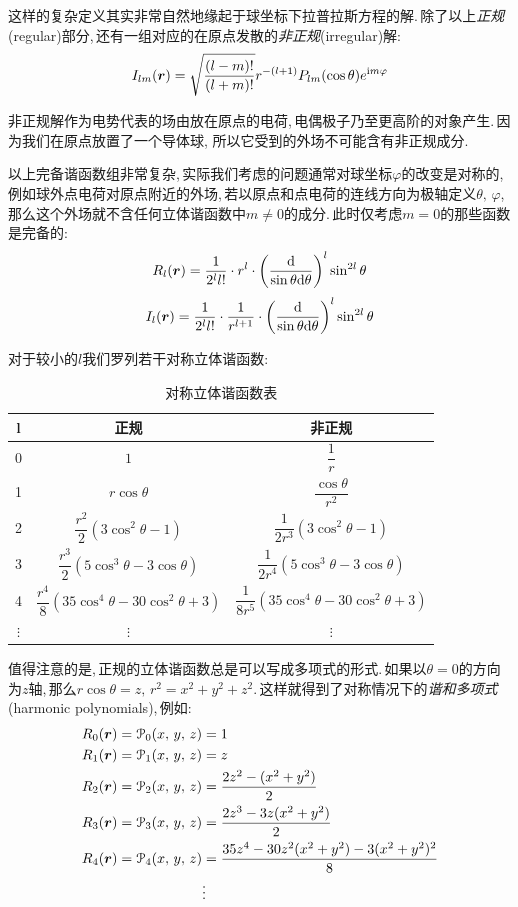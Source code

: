 这样的复杂定义其实非常自然地缘起于球坐标下拉普拉斯方程的解.\,除了以上\emph{正规}(regular)部分,\,还有一组对应的在原点发散的\emph{非正规}(irregular)解:
\[I_{lm}(\boldsymbol{r})=\sqrt{\frac{(l-m)!}{(l+m)!}}r^{-(l+1)}P_{lm}(\cos\theta)e^{{\rm i} m\varphi}\]

非正规解作为电势代表的场由放在原点的电荷,\,电偶极子乃至更高阶的对象产生.\,因为我们在原点放置了一个导体球, 所以它受到的外场不可能含有非正规成分.

以上完备谐函数组非常复杂,\,实际我们考虑的问题通常对球坐标$\varphi$的改变是对称的,\,例如球外点电荷对原点附近的外场,\,若以原点和点电荷的连线方向为极轴定义$\theta,\,\varphi$,\,那么这个外场就不含任何立体谐函数中$m\neq 0$的成分.\,此时仅考虑$m=0$的那些函数是完备的:
\[R_l(\boldsymbol{r})=\frac{1}{2^ll!}\cdot{r^l}\cdot\left(\frac{\textrm{d}}{\sin\theta\textrm{d} \theta}\right)^l\sin^{2l}\theta\]
\[I_l(\boldsymbol{r})=\frac{1}{2^ll!}\cdot\frac{1}{r^{l+1}}\cdot\left(\frac{\textrm{d}}{\sin\theta\textrm{d} \theta}\right)^l\sin^{2l}\theta\]

对于较小的$l$我们罗列若干对称立体谐函数:
\begin{table}[H]
\centering
\def\arraystretch{2}
\begin{tabular}{c|c|c}
\hline
l	&正规	&非正规 \\
\hline\hline
0	&$1$	&$\dfrac{1}{r}$\\\hline
1	&$r\cos\theta$	&$\dfrac{\cos\theta}{r^2}$\\\hline
2	&$\dfrac{r^2}{2}(3\cos^2\theta-1)$	&$\dfrac{1}{2r^3}(3\cos^2\theta-1)$\\\hline
3	&$\dfrac{r^3}{2}(5\cos^3\theta-3\cos\theta)$	&$\dfrac{1}{2r^4}(5\cos^3\theta-3\cos\theta)$\\\hline
4	&$\dfrac{r^4}{8}(35\cos^4\theta-30\cos^2\theta+3)$	&$\dfrac{1}{8r^5}(35\cos^4\theta-30\cos^2\theta+3)$\\\hline
$\vdots$&$\vdots$&$\vdots$\\\hline
\end{tabular}
\caption{对称立体谐函数表}
\end{table}

值得注意的是,\,正规的立体谐函数总是可以写成多项式的形式.\,如果以$\theta=0$的方向为$z$轴,\,那么$r\cos\theta=z,\,r^2=x^2+y^2+z^2$.\,这样就得到了对称情况下的\emph{谐和多项式}(harmonic polynomials),\,例如:
\begin{align}
R_0(\boldsymbol{r})=\mathcal{P}_0(x,\,y,\,z)	&=1\\
R_1(\boldsymbol{r})=\mathcal{P}_1(x,\,y,\,z)	&=z\\
R_2(\boldsymbol{r})=\mathcal{P}_2(x,\,y,\,z)	&=\frac{2z^2-(x^2+y^2)}{2}\\
R_3(\boldsymbol{r})=\mathcal{P}_3(x,\,y,\,z)	&=\frac{2z^3-3z(x^2+y^2)}{2}\\
R_4(\boldsymbol{r})=\mathcal{P}_4(x,\,y,\,z)	&=\frac{35z^4-30z^2(x^2+y^2)-3(x^2+y^2)^2}{8}\\
&\vdots
\end{align}

